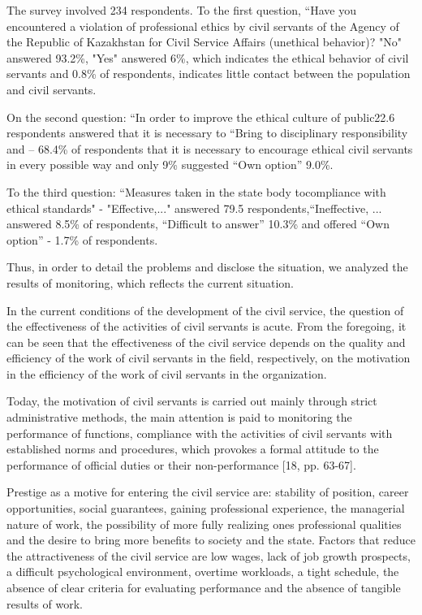 \begin{multicols}{2}
The survey involved 234 respondents. To the first question, ``Have you
encountered a violation of professional ethics by civil servants of the
Agency of the Republic of Kazakhstan for Civil Service Affairs
(unethical behavior)? "No" answered 93.2\%, "Yes" answered 6\%, which
indicates the ethical behavior of civil servants and 0.8\% of
respondents, indicates little contact between the population and civil
servants.

On the second question: ``In order to improve the ethical culture of
public22.6 respondents answered that it is necessary to ``Bring to
disciplinary responsibility and -- 68.4\% of respondents that it is
necessary to encourage ethical civil servants in every possible way and
only 9\% suggested ``Own option'' 9.0\%.

To the third question: ``Measures taken in the state body tocompliance
with ethical standards" - "Effective,..." answered 79.5
respondents,``Ineffective, ... answered 8.5\% of respondents,
``Difficult to answer'' 10.3\% and offered ``Own option'' - 1.7\% of
respondents.

Thus, in order to detail the problems and disclose the situation, we
analyzed the results of monitoring, which reflects the current
situation.

In the current conditions of the development of the civil service, the
question of the effectiveness of the activities of civil servants is
acute. From the foregoing, it can be seen that the effectiveness of the
civil service depends on the quality and efficiency of the work of civil
servants in the field, respectively, on the motivation in the efficiency
of the work of civil servants in the organization.

Today, the motivation of civil servants is carried out mainly through
strict administrative methods, the main attention is paid to monitoring
the performance of functions, compliance with the activities of civil
servants with established norms and procedures, which provokes a formal
attitude to the performance of official duties or their non-performance
{[}18, pp. 63-67{]}.

Prestige as a motive for entering the civil service are: stability of
position, career opportunities, social guarantees, gaining professional
experience, the managerial nature of work, the possibility of more fully
realizing one\textquotesingle s professional qualities and the desire to
bring more benefits to society and the state. Factors that reduce the
attractiveness of the civil service are low wages, lack of job growth
prospects, a difficult psychological environment, overtime workloads, a
tight schedule, the absence of clear criteria for evaluating performance
and the absence of tangible results of work.


\end{multicols}
